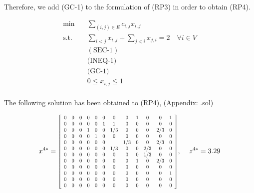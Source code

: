 \documentclass[12pt]{article}
\begin{document}
Therefore, we add (GC-1) to the formulation of (RP3) in order to obtain (RP4).

\begin{equation}
    \begin{aligned}
        \min \quad & \sum_{(i,j)\in E}c_{i,j}x_{i,j}\\
        \textrm{s.t.} \quad & \sum_{i<j}x_{i,j} + \sum_{j<i}x_{j,i} = 2 \quad \forall i \in V\\
        & (\text{SEC-1})    \\
        & \text{(INEQ-1)} \\
        & \text{(GC-1)} \\
        & 0 \leq x_{i,j}\leq 1   \\
    \end{aligned}
    \tag{P3}\label{opt-P2}
\end{equation}

The following solution has been obtained to (RP4), (Appendix: .sol)

\begin{equation}
    x^{4*} = 
\resizebox{0.5\linewidth}{!}{$
        \left[ \begin {array}{cccccccccccc} 
        
         0&0&0&0&0&0&0&0&1&0&0&1\\
         0&0&0&0&0&1&1&0&0&0&0&0\\
         0&0&0&1&0&0&1/3&0&0&0&2/3&0\\
         0&0&0&0&1&0&0&0&0&0&0&0\\
         0&0&0&0&0&0&&1/3&0&0&2/3&0\\
         0&0&0&0&0&0&1/3&0&0&2/3&0&0\\
         0&0&0&0&0&0&0&0&0&1/3&0&0\\
         0&0&0&0&0&0&0&0&1&0&2/3&0\\
         0&0&0&0&0&0&0&0&0&0&0&0\\
         0&0&0&0&0&0&0&0&0&0&0&1\\
         0&0&0&0&0&0&0&0&0&0&0&0\\
         0&0&0&0&0&0&0&0&0&0&0&0\\
        \end {array}
        \right]     
$}
\text{, } \quad z^{4*} = 3.29
\end{equation}
\end{document}

